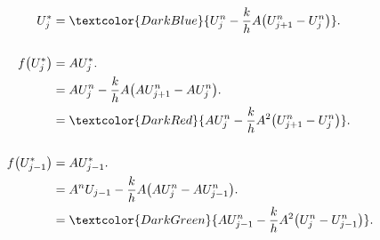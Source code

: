 \begin{frame}
  \frametitle{\secname}

  \begin{proofs}
    \begin{align*}
      U_{j}^{\ast} & =
      \textcolor{DarkBlue}{
        U_{j}^{n}-
        \frac{k}{h}A
        \big(
        U^{n}_{j+1}-
        U^{n}_{j}
      \big)}.          \\[\baselineskip]
      f
      \big(U_{j}^{\ast}\big)
                   & =
      AU_{j}^{\ast}.   \\
                   & =
      AU_{j}^{n}-
      \frac{k}{h}A
      \big(
      AU^{n}_{j+1}-
      AU^{n}_{j}
      \big).           \\
                   & =
      \textcolor{DarkRed}{
      AU_{j}^{n}-
      \frac{k}{h}A^{2}
      \big(
      U^{n}_{j+1}-
      U^{n}_{j}
      \big)}.
      \\[\baselineskip]
      f
      \big(U^{\ast}_{j-1}\big)
                   & =
      AU^{\ast}_{j-1}. \\
                   & =
      A^{n}U_{j-1}-
      \frac{k}{h}A
      \big(
      AU^{n}_{j}-
      AU^{n}_{j-1}
      \big).           \\
                   & =
      \textcolor{DarkGreen}{
      AU^{n}_{j-1}-
      \frac{k}{h}A^{2}
      \big(
      U^{n}_{j}-
      U^{n}_{j-1}
      \big)}.
    \end{align*}
  \end{proofs}
\end{frame}

